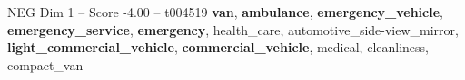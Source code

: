 \begin{textsample}{NEG Dim 1 – Score -4.00 – t004519}  \label{ex:f1_neg_022}
\textbf{van}, \textbf{ambulance}, \textbf{emergency\_vehicle}, \textbf{emergency\_service}, \textbf{emergency}, health\_care, automotive\_side-view\_mirror, \textbf{light\_commercial\_vehicle}, \textbf{commercial\_vehicle}, medical, cleanliness, compact\_van

\end{textsample}
